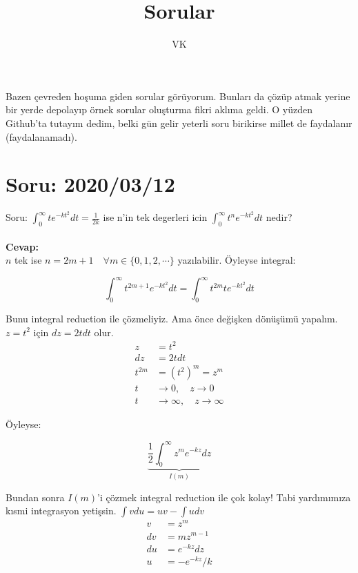 \documentclass{article}
\title{Sorular}
\author{VK}
\begin{document}
\maketitle

Bazen çevreden hoşuma giden sorular görüyorum. Bunları da çözüp atmak yerine bir yerde depolayıp örnek sorular oluşturma fikri aklıma geldi. O yüzden Github'ta tutayım dedim, belki gün gelir yeterli soru birikirse millet de faydalanır (faydalanamadı).

\section{Soru: 2020/03/12}
Soru: $\int_0^\infty te^{-kt^2}dt = \frac{1}{2k}$ ise n'in tek degerleri icin $\int_0^\infty t^ne^{-kt^2}dt$ nedir?
\\ \\
\textbf{Cevap: }\\

$n$ tek ise $n = 2m+1 \quad \forall m \in \{0,1,2,\cdots \}$ yazılabilir. Öyleyse integral: 

\begin{equation}
    \int_0^\infty t^{2m+1}e^{-kt^2}dt = \int_0^\infty t^{2m}te^{-kt^2}dt
\end{equation}

Bunu integral reduction ile çözmeliyiz. Ama önce değişken dönüşümü yapalım. $z = t^2$ için $dz = 2tdt$ olur.
\begin{align}
    z &= t^2 \\
    dz&= 2tdt \\
    t^{2m} &= (t^2)^m = z^m \\
    t &\rightarrow 0, \quad z \rightarrow 0 \\
    t &\rightarrow \infty, \quad  z \rightarrow \infty
\end{align}

Öyleyse:

\begin{equation}
     \underbrace{\frac{1}{2} \int_0^\infty z^m e^{-kz}dz}_{I(m)}
\end{equation}

Bundan sonra $I(m)$'i çözmek integral reduction ile çok kolay! Tabi yardımımıza kısmi integrasyon yetişsin. $\int vdu = uv - \int udv$
\begin{align}
    v &= z^m \\
    dv&= mz^{m-1} \\
    du&= e^{-kz}dz \\
    u &= -e^{-kz}/k \\
\end{align}
\end{document}
